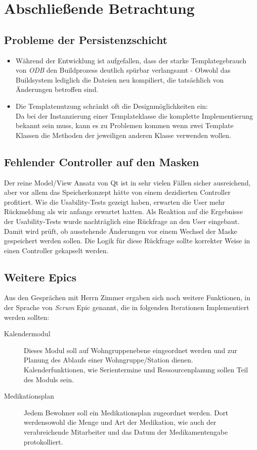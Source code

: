 \section{Abschließende Betrachtung}
\label{sec:abschluss}

\subsection{Probleme der Persistenzschicht}
\begin{itemize}
	\item Während der Entwicklung ist aufgefallen, dass der starke Templategebrauch von \textit{ODB} den Buildprozess deutlich spürbar verlangsamt - Obwohl das Buildsystem lediglich die Dateien neu kompiliert, die tatsächlich von Änderungen betroffen sind.\\
	\item Die Templatenutzung schränkt oft die Designmöglichkeiten ein:\\
		Da bei der Instanzierung einer Templateklasse die komplette Implementierung bekannt sein muss,
		kann es zu Problemen kommen wenn zwei Template Klassen die Methoden der jeweiligen anderen Klasse verwenden wollen.
\end{itemize}
\subsection{Fehlender Controller auf den Masken}
Der reine Model/View Ansatz von Qt ist in sehr vielen Fällen sicher ausreichend, aber vor allem das Speicherkonzept hätte von einem dezidierten
Controller profitiert. Wie die Usability-Tests gezeigt haben, erwarten die User mehr Rückmeldung als wir anfangs erwartet hatten. Als Reaktion auf
die Ergebnisse der Usability-Tests wurde nachträglich eine Rückfrage an den User eingebaut. Damit wird prüft, ob ausstehende Änderungen vor
einem Wechsel der Maske gespeichert werden sollen. Die Logik für diese Rückfrage sollte korrekter Weise in einen Controller gekapselt werden. 

\subsection{Weitere Epics}
Aus den Gesprächen mit Herrn Zimmer ergaben sich noch weitere Funktionen, in der Sprache von \textit{Scrum} Epic genannt, die in folgenden
Iterationen Implementiert werden sollten:
\begin{description}
 \item[Kalendermodul] Dieses Modul soll auf Wohngruppenebene eingeordnet werden und zur Planung des Ablaufs einer Wohngruppe/Station dienen.
Kalenderfunktionen, wie Serientermine und Ressourcenplanung sollen Teil des Moduls sein.
 \item[Medikationsplan] Jedem Bewohner soll ein Medikationsplan zugeordnet werden. Dort werdensowohl die Menge und Art der Medikation, wie auch der
verabreichende Mitarbeiter und das Datum der Medikamentengabe protokolliert.
\end{description}

 